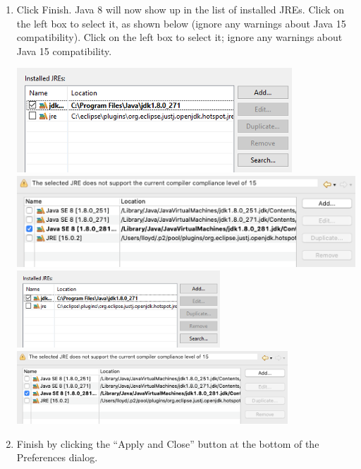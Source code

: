 \begin{enumerate}
\item Click {\sf Finish}. Java 8 will now show up in the list of
installed JREs. 
\ifWindows %
Click on the left box to select it, as shown
below (ignore any warnings about Java 15 compatibility).
\fi %
\fi %
\ifLinux %
Click on the left box to select it; ignore any warnings about Java
15 compatibility.
\else %
\begin{center}
\iflatexml
  \ifWindows
     \includegraphics[]{images/EclipseInstalledJREs}
  \else
     \includegraphics[]{images/EclipseInstalledJREsMacOS}
  \fi
\else
  \ifWindows
     \includegraphics[width=0.6\textwidth]{images/EclipseInstalledJREs}
  \else
     \includegraphics[width=0.8\textwidth]{images/EclipseInstalledJREsMacOS}
  \fi
\fi
\end{center}
\fi %

\item Finish by clicking the ``{\sf Apply and Close}'' button at the
bottom of the {\sf Preferences} dialog.

\end{enumerate}

